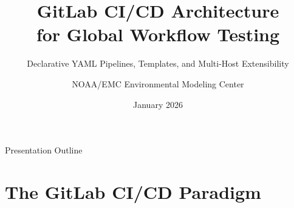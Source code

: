 \documentclass[aspectratio=169]{beamer}
\title[GitLab CI for Global Workflow]{GitLab CI/CD Architecture\\for Global Workflow Testing}
\subtitle{Declarative YAML Pipelines, Templates, and Multi-Host Extensibility}
\author{NOAA/EMC Environmental Modeling Center}
\institute{Global Workflow Development Team}
\date{January 2026}
\begin{document}
\begin{frame}
\titlepage
\end{frame}

\begin{frame}[fragile]{Presentation Outline}
\tableofcontents
\end{frame}

\section{The GitLab CI/CD Paradigm}
\end{document}
